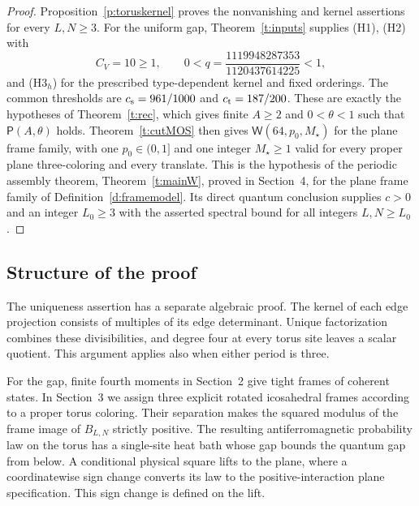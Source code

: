 \begin{proof}
Proposition~\ref{p:toruskernel} proves the nonvanishing and kernel
assertions for every \(L,N\ge3\). For the uniform gap,
Theorem~\ref{t:inputs} supplies (H1), (H2) with
\[
 C_V=10\ge1,\qquad
 0<q=\frac{1119948287353}{1120437614225}<1,
\]
and (H3\(_h\)) for the prescribed type-dependent kernel and fixed
orderings. The common thresholds are \(c_{\rm s}=961/1000\) and
\(c_{\rm t}=187/200\).
These are exactly the hypotheses of Theorem~\ref{t:rec}, which
gives finite \(A\ge2\) and \(0<\theta<1\) such that
\(\mathsf P(A,\theta)\) holds.
Theorem~\ref{t:cutMOS} then gives
\(\mathsf W(64,p_0,M_\star)\) for the plane frame family, with
one \(p_0\in(0,1]\) and one integer \(M_\star\ge1\) valid for
every proper plane three-coloring and every translate.
This is the hypothesis of the periodic assembly theorem,
Theorem~\ref{t:mainW}, proved in Section~4, for the plane frame
family of Definition~\ref{d:framemodel}. Its direct quantum
conclusion supplies \(c>0\) and an integer \(L_0\ge3\) with the
asserted spectral bound for all integers \(L,N\ge L_0\).
\end{proof}

\subsection{Structure of the proof}

The uniqueness assertion has a separate algebraic proof. The kernel
of each edge projection consists of multiples of its edge determinant.
Unique factorization combines these divisibilities, and degree four
at every torus site leaves a scalar quotient. This argument applies
also when either period is three.

For the gap, finite fourth moments in Section~2 give tight frames of
coherent states. In Section~3 we assign three explicit rotated
icosahedral frames according to a proper torus coloring. Their
separation makes the squared modulus of the frame image of
\(B_{L,N}\) strictly positive. The resulting antiferromagnetic
probability law on the torus has a single-site heat bath whose gap
bounds the quantum gap from below. A conditional physical square
lifts to the plane, where a coordinatewise sign change converts its
law to the positive-interaction plane specification. This sign
change is defined on the lift.

